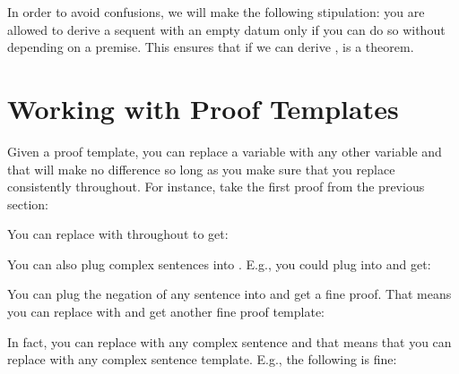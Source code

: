 In order to avoid confusions, we will make the following stipulation: you are 
allowed to derive a sequent with an empty datum only if you can do so without 
depending on a premise. This ensures that if we can derive ,  
is a theorem.

\section{Working with Proof Templates}


Given a proof template, you can replace a variable with any other variable and 
that will make no difference so long as you make sure that you replace 
consistently throughout.  For instance, take the first proof from the previous 
section:

\begin{argument}

 \aitem {}
 \aitem {}

\end{argument}

You can replace  with  throughout to get:

\begin{argument}

 \aitem {}
 \aitem {}

\end{argument}

You can also plug complex sentences into . E.g., you could plug  
into  and get:

\begin{argument}

 \aitem {}
 \aitem {}

\end{argument}

You can plug the negation of any sentence into  and get a fine proof.  That 
means you can replace  with  and get another fine proof template:

\begin{argument}

 \aitem {}
 \aitem {}

\end{argument}

In fact, you can replace  with any complex sentence and that means that you 
can replace  with any complex sentence template. E.g., the following is 
fine:
\begin{argument}

 \aitem {}
 \aitem {}

\end{argument}

